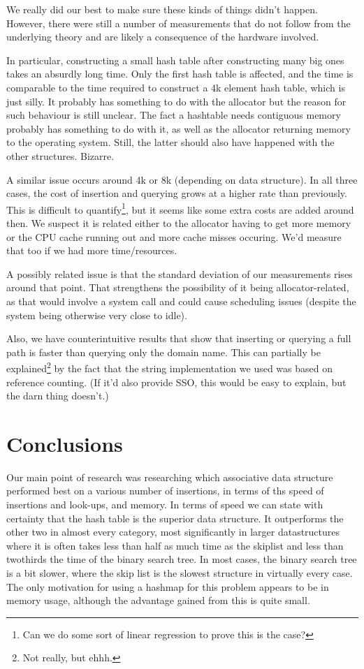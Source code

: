 \documentclass[12pt,a4paper]{article}
\begin{document}
    We really did our best to make sure these kinds of things didn't happen.  However, there were
    still a number of measurements that do not follow from the underlying theory and are likely a
    consequence of the hardware involved.

    In particular, constructing a small hash table after constructing many big ones takes an
    absurdly long time.  Only the first hash table is affected, and the time is comparable to the
    time required to construct a 4k element hash table, which is just silly.  It probably has
    something to do with the allocator but the reason for such behaviour is still unclear.  The fact
    a hashtable needs contiguous memory probably has something to do with it, as well as the
    allocator returning memory to the operating system.  Still, the latter should also have happened
    with the other structures.  Bizarre.

    A similar issue occurs around 4k or 8k (depending on data structure).  In all three cases, the
    cost of insertion and querying grows at a higher rate than previously.  This is difficult to
    quantify\footnote{Can we do some sort of linear regression to prove this is the case?}, but it
    seems like some extra costs are added around then.  We suspect it is related either to the
    allocator having to get more memory or the CPU cache running out and more cache misses occuring.
    We'd measure that too if we had more time/resources.

    A possibly related issue is that the standard deviation of our measurements rises around that
    point.  That strengthens the possibility of it being allocator-related, as that would involve a
    system call and could cause scheduling issues (despite the system being otherwise very close to
    idle).

    Also, we have counterintuitive results that show that inserting or querying a full path is
    faster than querying only the domain name.  This can partially be explained\footnote{Not really,
    but ehhh.} by the fact that the string implementation we used was based on reference counting.
    (If it'd also provide SSO, this would be easy to explain, but the darn thing doesn't.)


    \section{Conclusions}
    Our main point of research was researching which associative data structure performed best on
    a various number of insertions, in terms of ths speed of insertions and look-ups, and memory.
    In terms of speed we can state with certainty that the hash table is the superior data structure.
    It outperforms the other two in almost every category, most significantly in larger datastructures where
    it is often takes less than half as much time as the skiplist and less than twothirds the time of the binary search tree.
    In most cases, the binary search tree is a bit slower, where the skip list is the slowest structure in
    virtually every case. The only motivation for using a hashmap for this problem appears to be in memory usage,
    although the advantage gained from this is quite small.
    
\end{document}
